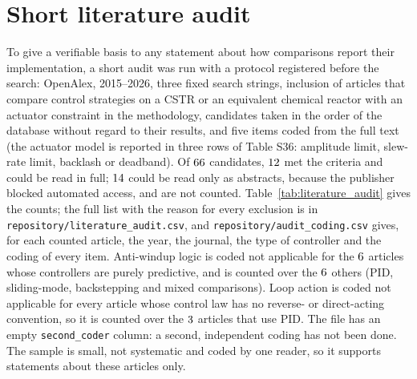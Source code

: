 \documentclass[11pt]{article}
\begin{document}






\section{Short literature audit}\label{supp:audit}
To give a verifiable basis to any statement about how comparisons report their implementation, a short audit was run with a protocol registered before the search: OpenAlex, 2015--2026, three fixed search strings, inclusion of articles that compare control strategies on a CSTR or an equivalent chemical reactor with an actuator constraint in the methodology, candidates taken in the order of the database without regard to their results, and five items coded from the full text (the actuator model is reported in three rows of Table S36: amplitude limit, slew-rate limit, backlash or deadband). Of $66$ candidates, $12$ met the criteria and could be read in full; $14$ could be read only as abstracts, because the publisher blocked automated access, and are not counted. Table~\ref{tab:literature_audit} gives the counts; the full list with the reason for every exclusion is in \texttt{repository/literature\_audit.csv}, and \texttt{repository/audit\_coding.csv} gives, for each counted article, the year, the journal, the type of controller and the coding of every item. Anti-windup logic is coded not applicable for the $6$ articles whose controllers are purely predictive, and is counted over the $6$ others (PID, sliding-mode, backstepping and mixed comparisons). Loop action is coded not applicable for every article whose control law has no reverse- or direct-acting convention, so it is counted over the $3$ articles that use PID. The file has an empty \texttt{second\_coder} column: a second, independent coding has not been done. The sample is small, not systematic and coded by one reader, so it supports statements about these articles only.





\end{document}
